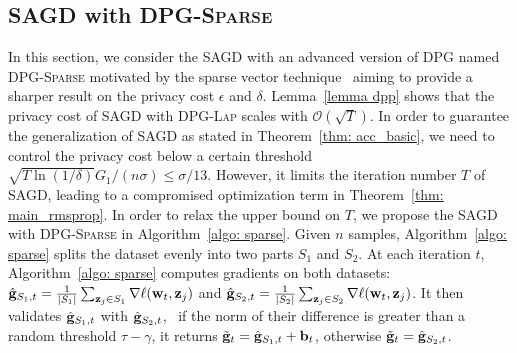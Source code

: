 \documentclass[11pt]{article}
\begin{document}
\subsection{\textsc{SAGD} with \textsc{DPG-Sparse}} \label{subsec: SAGD-sparse}
\vspace{-0.05in}

In this section, we consider the \textsc{SAGD} with an advanced version of \textsc{DPG} named \textsc{DPG-Sparse} motivated by the sparse vector technique~\citep{dwro2014} aiming to provide a sharper result on the privacy cost $\epsilon$ and $\delta$.
Lemma~\ref{lemma dpp} shows that the privacy cost of \textsc{SAGD} with \textsc{DPG-Lap} scales with $\mathcal{O}(\sqrt{T})$. In order to guarantee the generalization of \textsc{SAGD} as stated in Theorem~\ref{thm: acc_basic}, we need to control the privacy cost below a certain threshold \ie $\sqrt{T \ln(1/\delta)} G_1/(n\sigma) \leq \sigma/13$. However, it limits the iteration number $T$ of \textsc{SAGD}, leading to a compromised optimization term in Theorem~\ref{thm: main_rmsprop}.  
In order to relax the upper bound on $T$, we propose the \textsc{SAGD} with \textsc{DPG-Sparse} in Algorithm~\ref{algo: sparse}.
Given $n$ samples, Algorithm~\ref{algo: sparse} splits the dataset evenly into two parts $S_1$ and $S_2$. 
At each iteration $t$, Algorithm~\ref{algo: sparse} computes gradients on both datasets:
$\hat {\mathbf{g}}_{S_1,t} = \frac{1}{|S_1|} \sum_{\mathbf{z}_j \in S_1}\nabla \ell(\mathbf{w}_t, \mathbf{z}_j)$ and $\hat {\mathbf{g}}_{S_2,t} = \frac{1}{|S_2|} \sum_{\mathbf{z}_j \in S_2}\nabla \ell(\mathbf{w}_t, \mathbf{z}_j)$.
It then validates $\hat {\mathbf{g}}_{S_1,t} $ with $\hat {\mathbf{g}}_{S_2,t}$, \ie\ if the norm of their difference is greater than a random threshold $\tau-\gamma$, it returns $\tilde {\mathbf{g}}_t = \hat {\mathbf{g}}_{S_1,t} + \mathbf{b}_t$, otherwise $\tilde {\mathbf{g}}_t = \hat {\mathbf{g}}_{S_2,t}$.%
\end{document}
